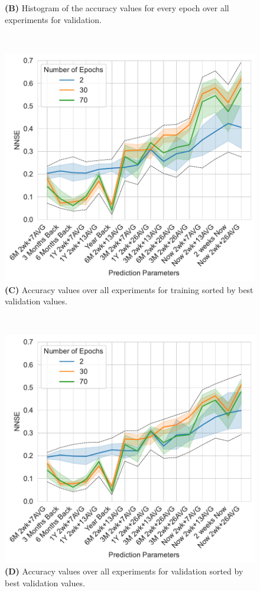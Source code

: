 \documentclass[utf8]{FrontiersinVancouver} %
\begin{document}
\begin{figure}[p]
\begin{center}
\begin{minipage}[t]{0.49\textwidth}
        {\bf (B)} Histogram of the accuracy values for every epoch over all experiments for validation.
     \end{minipage}
  \ \
     \begin{minipage}[t]{0.49\textwidth}
        \includegraphics[width=1.0\linewidth]{images/A100-NNSE-all-epochs-training-min-max}
        {\bf (C)} Accuracy values over all experiments for training sorted by best validation values.
     \end{minipage}
  \ \
     \begin{minipage}[t]{0.49\textwidth}
        \includegraphics[width=1.0\linewidth]{images/A100-NNSE-all-epochs-validation-min-max}
        {\bf (D)} Accuracy values over all experiments for validation sorted by best validation values.
     \end{minipage}


\end{center}
\end{figure}
\end{document}
